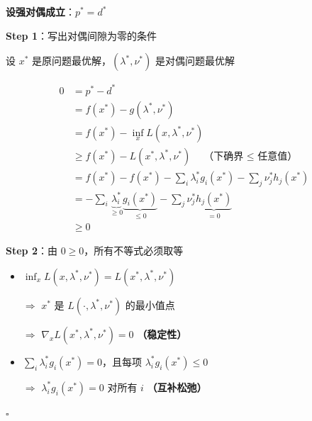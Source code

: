 \documentclass[12pt, a4paper]{ctexart}
\begin{document}
\begin{blackboard}

\textbf{设强对偶成立}：$p^* = d^*$

\textbf{Step 1}：写出对偶间隙为零的条件

设 $x^*$ 是原问题最优解，$(\lambda^*, \nu^*)$ 是对偶问题最优解

\begin{align*}
0 &= p^* - d^* \\
&= f(x^*) - g(\lambda^*, \nu^*) \\
&= f(x^*) - \inf_x L(x, \lambda^*, \nu^*) \\
&\geq f(x^*) - L(x^*, \lambda^*, \nu^*) \quad \text{（下确界 $\leq$ 任意值）} \\
&= f(x^*) - f(x^*) - \sum_i \lambda_i^* g_i(x^*) - \sum_j \nu_j^* h_j(x^*) \\
&= -\sum_i \underbrace{\lambda_i^*}_{\geq 0} \underbrace{g_i(x^*)}_{\leq 0} - \sum_j \nu_j^* \underbrace{h_j(x^*)}_{= 0} \\
&\geq 0
\end{align*}

\textbf{Step 2}：由 $0 \geq 0$，所有不等式必须取等

\begin{itemize}
    \item $\inf_x L(x, \lambda^*, \nu^*) = L(x^*, \lambda^*, \nu^*)$
    
    $\Rightarrow$ $x^*$ 是 $L(\cdot, \lambda^*, \nu^*)$ 的最小值点
    
    $\Rightarrow$ $\nabla_x L(x^*, \lambda^*, \nu^*) = 0$ \quad \textbf{（稳定性）}
    
    \item $\sum_i \lambda_i^* g_i(x^*) = 0$，且每项 $\lambda_i^* g_i(x^*) \leq 0$
    
    $\Rightarrow$ $\lambda_i^* g_i(x^*) = 0$ 对所有 $i$ \quad \textbf{（互补松弛）}
\end{itemize}

\hfill $\square$

\end{blackboard}
\end{document}
